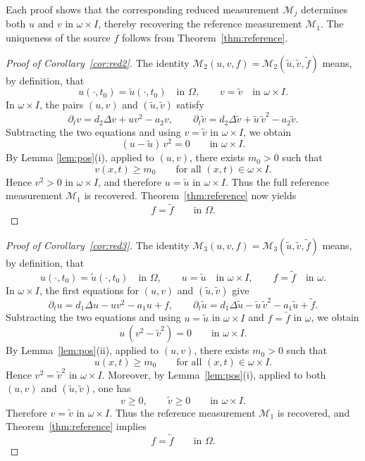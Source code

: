 \documentclass[12pt]{amsart}
\theoremstyle{plain}
\theoremstyle{definition}
\theoremstyle{remark}
\begin{document}
Each proof shows that the corresponding reduced measurement 
$\mathcal{M}_j$ determines both $u$ and $v$ in 
$\omega\times I$, thereby recovering the reference measurement 
$\mathcal{M}_1$.
The uniqueness of the source $f$ follows from 
Theorem~\ref{thm:reference}.

\begin{proof}[Proof of Corollary~\ref{cor:red2}]
The identity $\mathcal{M}_2(u,v,f) = \mathcal{M}_2(\widetilde u,\widetilde v,
\widetilde f)$ means, by definition, that
\[
u(\cdot,t_0) = \widetilde u(\cdot,t_0) \quad\text{in }\Omega, \qquad
v = \widetilde v \quad\text{in }\omega\times I.
\]
In $\omega\times I$, the pairs $(u,v)$ and $(\widetilde u,\widetilde v)$ 
satisfy
\[
\partial_t v=d_2\Delta v+uv^2-a_2v,
\qquad
\partial_t \widetilde v=d_2\Delta \widetilde v+\widetilde u\,\widetilde v^2
-a_2\widetilde v.
\]
Subtracting the two equations and using $v = \widetilde v$ in 
$\omega\times I$, 
we obtain
\[
(u-\tilde u)\,v^2=0
\qquad \text{in } \omega\times I.
\]
By Lemma \ref{lem:pos}(i), applied to $(u,v)$, 
there exists $m_0>0$ such that
\[
v(x,t)\ge m_0
\qquad \text{for all } (x,t)\in \omega\times I.
\]
Hence \(v^2>0\) in \(\omega\times I\), and therefore $ u = \widetilde u$
in $\omega\times I$.
Thus the full reference measurement \(\mathcal M_1\) is recovered.
Theorem~\ref{thm:reference} now yields
\[
f=\widetilde f \qquad \text{in } \Omega.
\]
\end{proof}

\begin{proof}[Proof of Corollary~\ref{cor:red3}]
The identity $\mathcal{M}_3(u,v,f)=\mathcal{M}_3(\widetilde u,\widetilde v,
\widetilde f)$ means, by definition, that
\[
u(\cdot,t_0)=\widetilde u(\cdot,t_0) \quad\text{in }\Omega, \qquad
u=\widetilde u \quad\text{in }\omega\times I, \qquad
f=\widetilde f \quad\text{in }\omega.
\]
In $\omega\times I$, the first equations for $(u,v)$ and $(\tilde u,\tilde v)$ give
\[
\partial_t u=d_1\Delta u-uv^2-a_1u+f,
\qquad
\partial_t \widetilde u=d_1\Delta \widetilde u
-\widetilde u\,\widetilde v^2-a_1\widetilde u+\widetilde f.
\]
Subtracting the two equations and using
\(u=\widetilde u\) in \(\omega\times I\) and \(f=\widetilde f\) in \(\omega\),
we obtain
\[
u\,(v^2-\widetilde v^2)=0
\qquad \text{in } \omega\times I.
\]
By Lemma~\ref{lem:pos}(ii), applied to $(u,v)$, there exists $m_0>0$ such that
\[
u(x,t)\ge m_0
\qquad \text{for all } (x,t)\in \omega\times I.
\]
Hence $ v^2=\widetilde v^2$ in $\omega\times I$.
Moreover, by Lemma~\ref{lem:pos}(i), applied to both $(u,v)$ and
$(\widetilde u,\widetilde v)$, one has
\[
v\ge 0,
\qquad
\widetilde v\ge 0
\qquad \text{in } \omega\times I.
\]
Therefore $ v=\widetilde v$ in $\omega\times I$.
Thus the reference measurement \(\mathcal M_1\) is recovered, and
Theorem~\ref{thm:reference} implies
\[
f=\widetilde f \qquad \text{in } \Omega.
\]
\end{proof}
\end{document}

